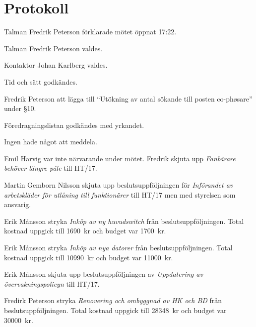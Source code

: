 \documentclass[10pt]{article}
\def\mo{Fredrik Peterson}
\def\ms{Johan Karlberg}
\begin{document}
\section*{Protokoll}
\begin{paragrafer}
Talman {\mo} förklarade mötet öppnat 17:22.

Talman {\mo} valdes.

Kontaktor {\ms} valdes.

Tid och sätt godkändes.

\valavj

\ingaadj

Fredrik Peterson \ypa att lägga till ``Utökning av antal sökande till posten co-phøsare'' under \S10.

Föredragningslistan godkändes med yrkandet.


Ingen hade något att meddela.

Emil Harvig var inte närvarande under mötet. Fredrik \ypa skjuta upp \emph{Fanbärare behöver längre påle} till HT/17.

\Mbaby

Martin Gemborn Nilsson \ypa skjuta upp beslutsuppföljningen för \emph{Införandet av arbetskläder för utlåning till funktionärer} till HT/17 men med styrelsen som ansvarig.

\Mbaby

Erik Månsson \ypa stryka \emph{Inköp av ny huvudswitch} från beslutsuppföljningen. Total kostnad uppgick till \SI{1690}{kr} och budget var \SI{1700}{kr}.

\Mbaby

Erik Månsson \ypa stryka \emph{Inköp av nya datorer} från beslutsuppföljningen. Total kostnad uppgick till \SI{10990}{kr} och budget var \SI{11000}{kr}.

\Mbaby

Erik Månsson \ypa skjuta upp beslutsuppföljningen av \emph{Uppdatering av övervakningspolicyn} till HT/17.

\Mbaby

Fredirk Peterson \ypa stryka \emph{Renovering och ombyggnad av HK och BD} från beslutsuppföljningen. Total kostnad uppgick till \SI{28348}{kr} och budget var \SI{30000}{kr}.


\end{paragrafer}
\end{document}
